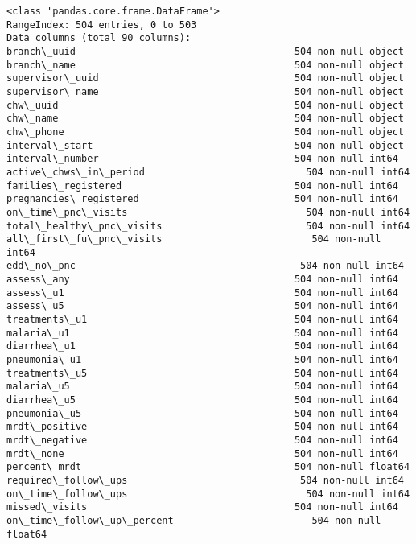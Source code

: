 \documentclass[11pt]{article}
\begin{document}
    \begin{Verbatim}[commandchars=\\\{\}]
<class 'pandas.core.frame.DataFrame'>
RangeIndex: 504 entries, 0 to 503
Data columns (total 90 columns):
branch\_uuid                                      504 non-null object
branch\_name                                      504 non-null object
supervisor\_uuid                                  504 non-null object
supervisor\_name                                  504 non-null object
chw\_uuid                                         504 non-null object
chw\_name                                         504 non-null object
chw\_phone                                        504 non-null object
interval\_start                                   504 non-null object
interval\_number                                  504 non-null int64
active\_chws\_in\_period                            504 non-null int64
families\_registered                              504 non-null int64
pregnancies\_registered                           504 non-null int64
on\_time\_pnc\_visits                               504 non-null int64
total\_healthy\_pnc\_visits                         504 non-null int64
all\_first\_fu\_pnc\_visits                          504 non-null int64
edd\_no\_pnc                                       504 non-null int64
assess\_any                                       504 non-null int64
assess\_u1                                        504 non-null int64
assess\_u5                                        504 non-null int64
treatments\_u1                                    504 non-null int64
malaria\_u1                                       504 non-null int64
diarrhea\_u1                                      504 non-null int64
pneumonia\_u1                                     504 non-null int64
treatments\_u5                                    504 non-null int64
malaria\_u5                                       504 non-null int64
diarrhea\_u5                                      504 non-null int64
pneumonia\_u5                                     504 non-null int64
mrdt\_positive                                    504 non-null int64
mrdt\_negative                                    504 non-null int64
mrdt\_none                                        504 non-null int64
percent\_mrdt                                     504 non-null float64
required\_follow\_ups                              504 non-null int64
on\_time\_follow\_ups                               504 non-null int64
missed\_visits                                    504 non-null int64
on\_time\_follow\_up\_percent                        504 non-null float64

\end{Verbatim}
\end{document}

